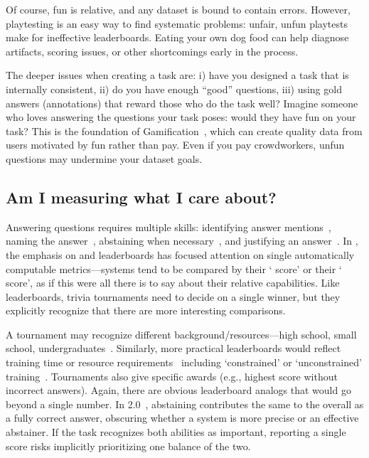 Of course, fun is relative, and any dataset is bound to contain errors.
However, playtesting is an easy way to find systematic problems: unfair, unfun playtests make for ineffective leaderboards.
Eating your own dog food can help diagnose artifacts, scoring issues, or other shortcomings early in the process.

The deeper issues when creating a  task are:
i) have you designed a task that is internally consistent,
ii) do you have enough ``good'' questions,
iii) using gold answers (annotations) that reward those who do the task well?
Imagine someone who loves answering the questions your task poses: would they have fun on your task?
This is the foundation of Gamification~\cite{ahn-06}, which can create quality data from users motivated by fun rather than pay.
Even if you pay crowdworkers, unfun questions may undermine your dataset goals.

\subsection{Am I measuring what I care about?}
\label{subsection:measuring-what-you-care-about}

Answering questions requires multiple skills: identifying answer mentions~\cite{hermann-15},
naming the answer~\cite{yih-15}, abstaining when necessary~\cite{rajpurkar-18}, and justifying an answer~\cite{fever-18}.
In \qa{}, the emphasis on  and leaderboards has focused attention on single automatically computable
metrics---systems tend to be compared by their `\squad{} score' or their ` score', as if this were all there
is to say about their relative capabilities.  Like  leaderboards, trivia tournaments need to decide
on a single winner, but they explicitly recognize that there are more interesting comparisons.

A tournament may recognize different background/resources---high school, small school, undergraduates~\cite{naqt-eligibility}.  Similarly, more practical leaderboards would reflect training time
or resource requirements~\citep[see][]{dodge-19} including `constrained' or `unconstrained'
training~\citep{bojar-2014}.
Tournaments also give specific awards (e.g., highest score without incorrect
answers).  Again, there are obvious leaderboard analogs that would go beyond a single number.
In \squad{} 2.0~\cite{rajpurkar-18}, abstaining contributes the same
to the overall \fone{} as a fully correct answer, obscuring whether a system
is more precise or an effective abstainer.  If the task
recognizes both abilities as important, reporting a single score risks implicitly prioritizing one balance of the two.

